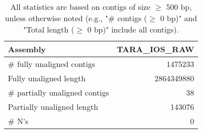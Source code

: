 \documentclass[12pt,a4paper]{article}
\begin{document}
\begin{table}[ht]
\begin{center}
\caption{All statistics are based on contigs of size $\geq$ 500 bp, unless otherwise noted (e.g., "\# contigs ($\geq$ 0 bp)" and "Total length ($\geq$ 0 bp)" include all contigs).}
\begin{tabular}{|l*{1}{|r}|}
\hline
Assembly & TARA\_IOS\_RAW \\ \hline
\# fully unaligned contigs & 1475233 \\ \hline
Fully unaligned length & 2864349880 \\ \hline
\# partially unaligned contigs & 38 \\ \hline
Partially unaligned length & 143076 \\ \hline
\# N's & 0 \\ \hline
\end{tabular}
\end{center}
\end{table}
\end{document}
